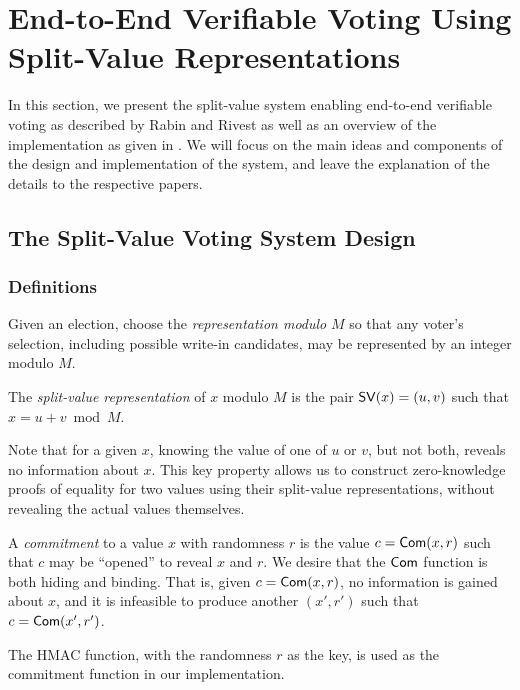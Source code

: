 \chapter{End-to-End Verifiable Voting Using Split-Value Representations} \label{sv}

In this section, we present the split-value system enabling end-to-end verifiable voting as described by Rabin and Rivest \cite{rrv} as well as an overview of the implementation as given in \cite{marco}. We will focus on the main ideas and components of the design and implementation of the system, and leave the explanation of the details to the respective papers.

\section{The Split-Value Voting System Design} \label{sv:design}

\subsection{Definitions} \label{sv:design:defns}

Given an election, choose the \emph{representation modulo} $M$ so that any voter's selection, including possible write-in candidates, may be represented by an integer modulo $M$.

\begin{definition}
The \emph{split-value representation} of $x$ modulo $M$ is the pair $\operatorname{\mathsf{SV}}(x)=(u,v)$ such that $x = u+v \bmod M$.
\end{definition}

Note that for a given $x$, knowing the value of one of $u$ or $v$, but not both, reveals no information about $x$. This key property allows us to construct zero-knowledge proofs of equality for two values using their split-value representations, without revealing the actual values themselves.

\begin{definition}
A \emph{commitment} to a value $x$ with randomness $r$ is the value $c = \operatorname{\mathsf{Com}}(x, r)$ such that $c$ may be ``opened'' to reveal $x$ and $r$. We desire that the $\operatorname{\mathsf{Com}}$ function is both hiding and binding. That is, given $c = \operatorname{\mathsf{Com}}(x, r)$, no information is gained about $x$, and it is infeasible to produce another $(x', r')$ such that $c = \operatorname{\mathsf{Com}}(x', r')$.
\end{definition}

The HMAC function, with the randomness $r$ as the key, is used as the commitment function in our implementation.

